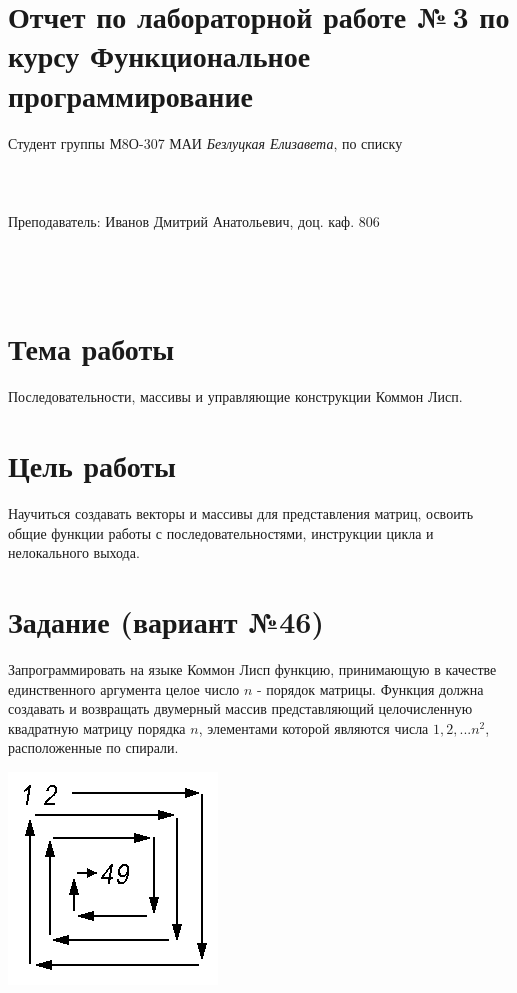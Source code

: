 \documentclass[12pt]{article}
\begin{document}
\section*{Отчет по лабораторной работе №\,3 
по курсу \guillemotleft  Функциональное программирование\guillemotright}
\begin{flushright}
Студент группы М8О-307 МАИ \textit{Безлуцкая Елизавета},  по списку \\
 \\
 \\
\ \\
Преподаватель: Иванов Дмитрий Анатольевич, доц. каф. 806 \\
 \\
 \\
 \\

\end{flushright}

\section{Тема работы}
Последовательности, массивы и управляющие конструкции Коммон Лисп.

\section{Цель работы}
Научиться создавать векторы и массивы для представления матриц, освоить общие функции работы с последовательностями, инструкции цикла и нелокального выхода.

\section{Задание (вариант №46)}
Запрограммировать на языке Коммон Лисп функцию, принимающую в качестве единственного аргумента целое число $n$ - порядок матрицы. Функция должна создавать и возвращать двумерный массив представляющий целочисленную квадратную матрицу порядка $n$, элементами которой являются числа $1, 2, ... n^2$, расположенные по спирали.

\includegraphics{matrix.png}
\end{document}
